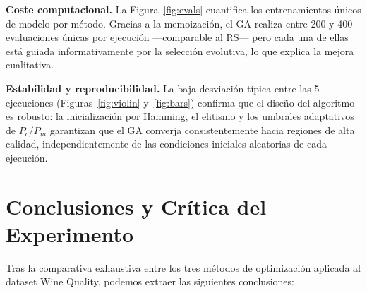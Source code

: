 \documentclass[12pt, a4paper]{article}
\begin{document}
\textbf{Coste computacional.} La Figura~\ref{fig:evals} cuantifica los entrenamientos
únicos de modelo por método. Gracias a la memoización, el GA realiza entre 200 y 400
evaluaciones únicas por ejecución ---comparable al RS--- pero cada una de ellas está
guiada informativamente por la selección evolutiva, lo que explica la mejora cualitativa.

\textbf{Estabilidad y reproducibilidad.} La baja desviación típica entre las 5
ejecuciones (Figuras~\ref{fig:violin} y~\ref{fig:bars}) confirma que el diseño del
algoritmo es robusto: la inicialización por Hamming, el elitismo y los umbrales
adaptativos de $P_c/P_m$ garantizan que el GA converja consistentemente hacia regiones
de alta calidad, independientemente de las condiciones iniciales aleatorias de cada
ejecución.

\section{Conclusiones y Crítica del Experimento}

Tras la comparativa exhaustiva entre los tres métodos de optimización aplicada al dataset
Wine Quality, podemos extraer las siguientes conclusiones:
\end{document}
